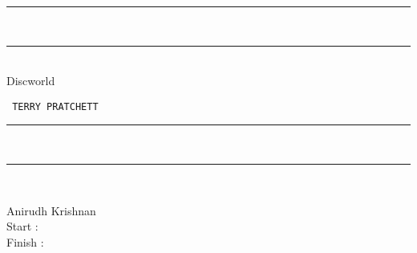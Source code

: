 \begin{titlepage}
    \begin{center}
        \vspace*{8em}

        {\color{violet1} \rule[1pt]{13cm}{2pt}} \\[-7pt]
        {\color{violet2} \rule[0.5pt]{13cm}{1pt}} \\[20pt]
        {\myfont \Huge \color{violet3} Discworld}

        \vspace{5em}
        \texttt{\color{violet3} \Large TERRY PRATCHETT} \\[20pt]
        {\color{violet2} \rule[0.5pt]{13cm}{1pt}} \\[-5pt]
        {\color{violet1} \rule[1pt]{13cm}{2pt}} \\

        \vfill

        {\large \ttfamily Anirudh Krishnan} \\
        \vspace{1em}
        {\ttfamily\large Start :  } \\
        {\ttfamily\large Finish :  }
    \end{center}
\end{titlepage}